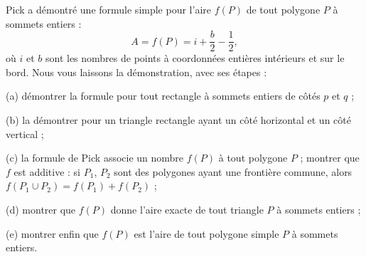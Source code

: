 Pick a démontré une formule simple pour l'aire $f(P)$ de tout polygone $P$ à sommets entiers :
\[ A = f(P) = i + \frac{b}{2} - \frac{1}{2}, \]
où $i$ et $b$ sont les nombres de points à coordonnées entières intérieurs et sur le bord. Nous vous laissons la démonstration, avec ses étapes :

(a) démontrer la formule pour tout rectangle à sommets entiers de côtés $p$ et $q$ ;

(b) la démontrer pour un triangle rectangle ayant un côté horizontal et un côté vertical ;

(c) la formule de Pick associe un nombre $f(P)$ à tout polygone $P$ ; montrer que $f$ est additive : si $P_1$, $P_2$ sont des polygones ayant une frontière commune, alors $f(P_1 \cup P_2) = f(P_1) + f(P_2)$ ;

(d) montrer que $f(P)$ donne l'aire exacte de tout triangle $P$ à sommets entiers ;

(e) montrer enfin que $f(P)$ est l'aire de tout polygone simple $P$ à sommets entiers.
